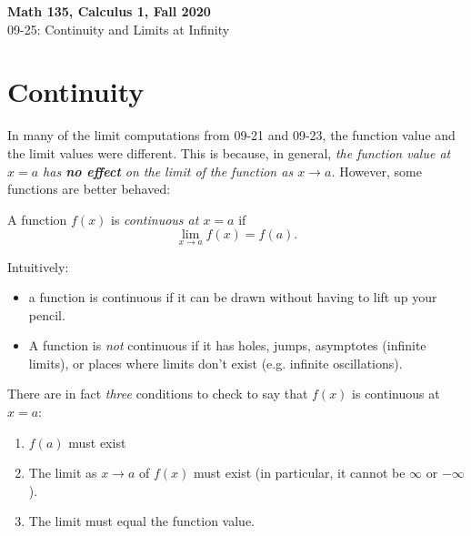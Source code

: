 \documentclass[11pt,reqno,final]{amsart}
\numberwithin{equation}{section}
\numberwithin{figure}{section}
\theoremstyle{definition} %
\newcommand{\dlim}{\displaystyle\lim}
\begin{document}
\onehalfspacing

\begin{center}
        \textbf{\Large Math 135, Calculus 1, Fall 2020}\\[10pt]
        {\large 09-25: Continuity and Limits at Infinity}
\end{center}

\thispagestyle{empty}

\renewcommand{\thesection}{\Alph{section}}
\section{Continuity}

In many of the limit computations from 09-21 and 09-23, the function value and the limit values were different.
This is because, in general, \textit{the function value at $x=a$ has \textbf{no effect} on the limit of the function as $x \to a$.}
However, some functions are better behaved:
\begin{framed}
        A function $f(x)$ is \textit{continuous at $x=a$} if
        \[
                \dlim_{x \to a} f(x) = f(a).
        \]
\end{framed}

Intuitively:
\begin{itemize}
\item a function is continuous if it can be drawn without having to lift up your pencil.
\item A function is \textit{not} continuous if it has holes, jumps, asymptotes (infinite limits), or places where limits don't exist (e.g. infinite oscillations).
\end{itemize}

There are in fact \textit{three} conditions to check to say that $f(x)$ is continuous at $x=a$:
\begin{enumerate}[(1)]
\item $f(a)$ must exist
\item The limit as $x \to a$ of $f(x)$ must exist (in particular, it cannot be $\infty$ or $-\infty$).
\item The limit must equal the function value.
\end{enumerate}
\end{document}

